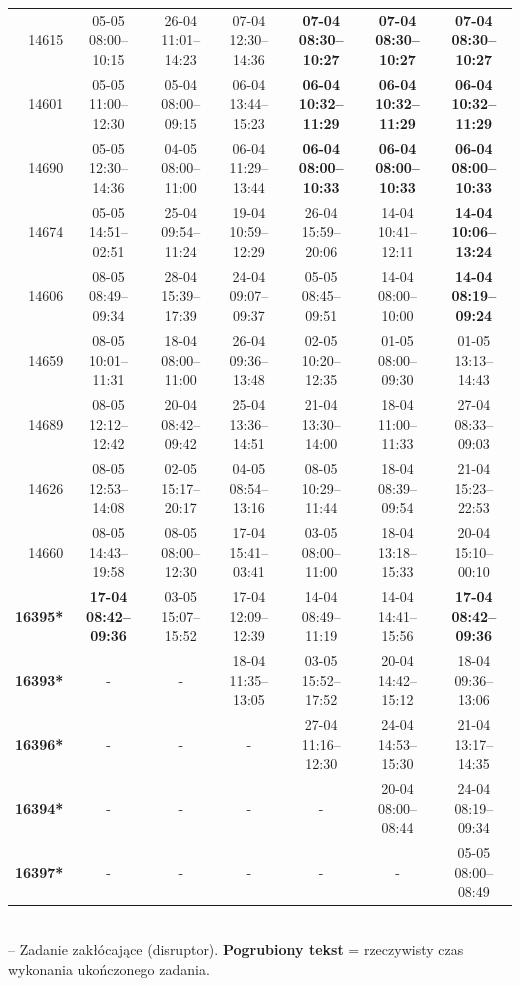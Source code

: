 \begin{table}[htbp]
\begin{tabular}{|r|c|c|c|c|c|c|}
14615 & 05-05 08:00--10:15 & 26-04 11:01--14:23 & 07-04 12:30--14:36 & \textbf{07-04 08:30--10:27} & \textbf{07-04 08:30--10:27} & \textbf{07-04 08:30--10:27} \\ 
14601 & 05-05 11:00--12:30 & 05-04 08:00--09:15 & 06-04 13:44--15:23 & \textbf{06-04 10:32--11:29} & \textbf{06-04 10:32--11:29} & \textbf{06-04 10:32--11:29} \\ 
14690 & 05-05 12:30--14:36 & 04-05 08:00--11:00 & 06-04 11:29--13:44 & \textbf{06-04 08:00--10:33} & \textbf{06-04 08:00--10:33} & \textbf{06-04 08:00--10:33} \\ 
14674 & 05-05 14:51--02:51 & 25-04 09:54--11:24 & 19-04 10:59--12:29 & 26-04 15:59--20:06 & 14-04 10:41--12:11 & \textbf{14-04 10:06--13:24} \\ 
14606 & 08-05 08:49--09:34 & 28-04 15:39--17:39 & 24-04 09:07--09:37 & 05-05 08:45--09:51 & 14-04 08:00--10:00 & \textbf{14-04 08:19--09:24} \\ 
14659 & 08-05 10:01--11:31 & 18-04 08:00--11:00 & 26-04 09:36--13:48 & 02-05 10:20--12:35 & 01-05 08:00--09:30 & 01-05 13:13--14:43 \\ 
14689 & 08-05 12:12--12:42 & 20-04 08:42--09:42 & 25-04 13:36--14:51 & 21-04 13:30--14:00 & 18-04 11:00--11:33 & 27-04 08:33--09:03 \\ 
14626 & 08-05 12:53--14:08 & 02-05 15:17--20:17 & 04-05 08:54--13:16 & 08-05 10:29--11:44 & 18-04 08:39--09:54 & 21-04 15:23--22:53 \\ 
14660 & 08-05 14:43--19:58 & 08-05 08:00--12:30 & 17-04 15:41--03:41 & 03-05 08:00--11:00 & 18-04 13:18--15:33 & 20-04 15:10--00:10 \\ 
\hline
\textbf{16395*} & \textbf{17-04 08:42--09:36} & 03-05 15:07--15:52 & 17-04 12:09--12:39 & 14-04 08:49--11:19 & 14-04 14:41--15:56 & \textbf{17-04 08:42--09:36} \\ 
\textbf{16393*} & - & - & 18-04 11:35--13:05 & 03-05 15:52--17:52 & 20-04 14:42--15:12 & 18-04 09:36--13:06 \\ 
\textbf{16396*} & - & - & - & 27-04 11:16--12:30 & 24-04 14:53--15:30 & 21-04 13:17--14:35 \\ 
\textbf{16394*} & - & - & - & - & 20-04 08:00--08:44 & 24-04 08:19--09:34 \\ 
\textbf{16397*} & - & - & - & - & - & 05-05 08:00--08:49 \\ 
\hline
\end{tabular}
\\ {\tiny * -- Zadanie zakłócające (disruptor). \textbf{Pogrubiony tekst} = rzeczywisty czas wykonania ukończonego zadania.}
\end{table}

